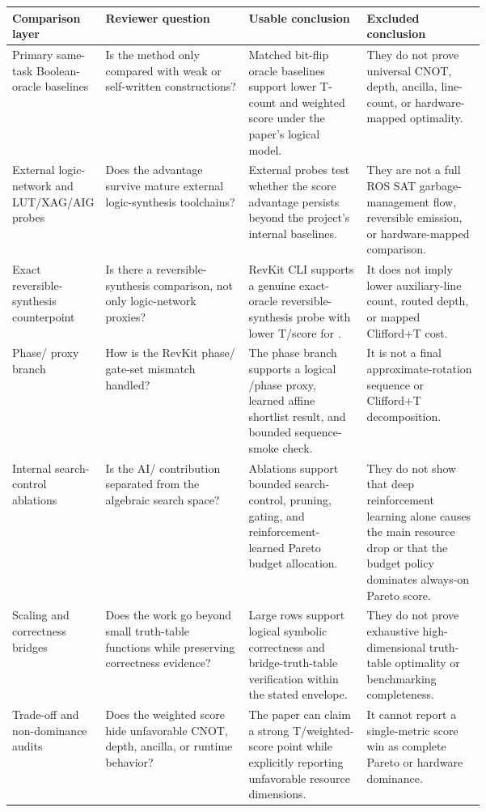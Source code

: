 \begin{tabularx}{\linewidth}{>{\raggedright\arraybackslash}p{0.18\linewidth}>{\raggedright\arraybackslash}X>{\raggedright\arraybackslash}p{0.25\linewidth}>{\raggedright\arraybackslash}p{0.25\linewidth}}
\toprule
Comparison layer & Reviewer question & Usable conclusion & Excluded conclusion \\
\midrule
Primary same-task Boolean-oracle baselines & Is the method only compared with weak or self-written constructions? & Matched bit-flip oracle baselines support lower T-count and weighted score under the paper's logical model. & They do not prove universal CNOT, depth, ancilla, line-count, or hardware-mapped optimality. \\
External logic-network and LUT/XAG/AIG probes & Does the advantage survive mature external logic-synthesis toolchains? & External probes test whether the score advantage persists beyond the project's internal baselines. & They are not a full ROS SAT garbage-management flow, reversible emission, or hardware-mapped comparison. \\
Exact reversible-synthesis counterpoint & Is there a reversible-synthesis comparison, not only logic-network proxies? & RevKit CLI supports a genuine exact-oracle reversible-synthesis probe with lower T/score for \method{}. & It does not imply lower auxiliary-line count, routed depth, or mapped Clifford+T cost. \\
Phase/\rz{} proxy branch & How is the RevKit phase/\rz{} gate-set mismatch handled? & The phase branch supports a logical \rz{}/phase proxy, learned affine shortlist result, and bounded sequence-smoke check. & It is not a final approximate-rotation sequence or Clifford+T decomposition. \\
Internal search-control ablations & Is the AI/\mcts{} contribution separated from the algebraic search space? & Ablations support bounded search-control, pruning, gating, and reinforcement-learned Pareto budget allocation. & They do not show that deep reinforcement learning alone causes the main resource drop or that the budget policy dominates always-on Pareto score. \\
Scaling and correctness bridges & Does the work go beyond small truth-table functions while preserving correctness evidence? & Large rows support logical symbolic correctness and bridge-truth-table verification within the stated envelope. & They do not prove exhaustive high-dimensional truth-table optimality or benchmarking completeness. \\
Trade-off and non-dominance audits & Does the weighted score hide unfavorable CNOT, depth, ancilla, or runtime behavior? & The paper can claim a strong T/weighted-score point while explicitly reporting unfavorable resource dimensions. & It cannot report a single-metric score win as complete Pareto or hardware dominance. \\
\bottomrule
\end{tabularx}
